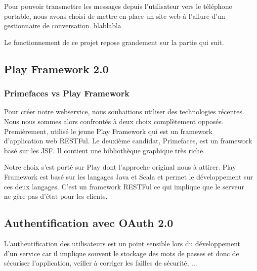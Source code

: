 Pour pouvoir transmettre les messages depuis l'utilisateur vers le téléphone portable, nous avons
choisi de mettre en place un site web à l'allure d'un gestionnaire de conversation. 
blablabla

Le fonctionnement de ce projet repose grandement sur la partie qui suit.



\subsection{Play Framework 2.0}

\subsubsection{Primefaces vs Play Framework}

Pour créer notre webservice, nous souhaitions utiliser des technologies récentes. Nous nous sommes
alors confrontés à deux choix complètement opposés. Premièrement, utilisé le jeune Play Framework 
qui est un framework d'application web RESTFul. Le deuxième candidat, Primefaces, est un framework
basé sur les JSF. Il contient une bibliothèque graphique très riche.

Notre choix s'est porté sur Play dont l'approche original nous à attirer. Play Framework est basé sur
les langages Java et Scala et permet le développement sur ces deux langages. C'est un framework RESTFul
ce qui implique que le serveur ne gère pas d'état pour les clients.


\subsection{Authentification avec OAuth 2.0}
\label{Authentification avec OAuth 2.0}

L'authentification des utilisateurs est un point sensible lors du développement d'un service car il
implique souvent le stockage des mots de passes et donc de sécuriser l'application, veiller à corriger
les failles de sécurité, ... 


